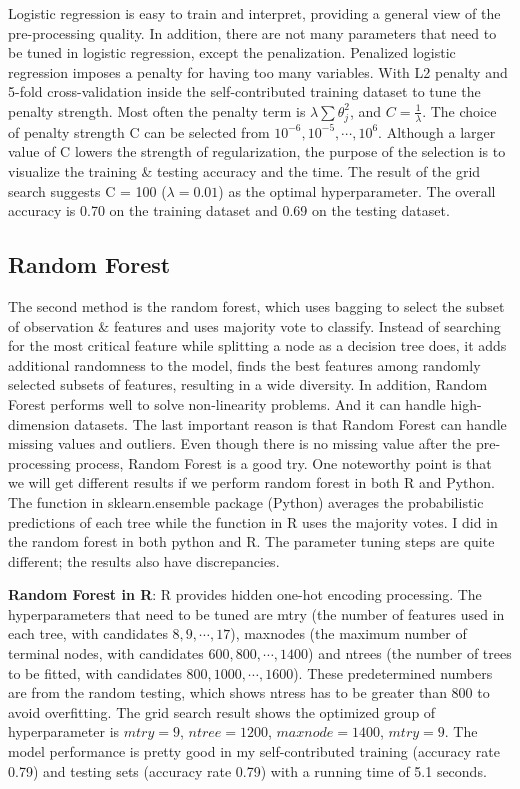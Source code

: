 \documentclass[11pt,]{article}
\begin{document}
Logistic regression is easy to train and interpret, providing a general
view of the pre-processing quality. In addition, there are not many
parameters that need to be tuned in logistic regression, except the
penalization. Penalized logistic regression imposes a penalty for having
too many variables. With L2 penalty and 5-fold cross-validation inside
the self-contributed training dataset to tune the penalty strength. Most
often the penalty term is \(\lambda \sum \theta_j ^2\), and
\(C = \frac{1}{\lambda}\). The choice of penalty strength C can be
selected from \(10^{-6}, 10^{-5},\cdots, 10^6\). Although a larger value
of C lowers the strength of regularization, the purpose of the selection
is to visualize the training \& testing accuracy and the time. The
result of the grid search suggests C = 100 (\(\lambda = 0.01\)) as the
optimal hyperparameter. The overall accuracy is 0.70 on the training
dataset and 0.69 on the testing dataset.

\hypertarget{random-forest}{%
\subsection{Random Forest}\label{random-forest}}

The second method is the random forest, which uses bagging to select the
subset of observation \& features and uses majority vote to classify.
Instead of searching for the most critical feature while splitting a
node as a decision tree does, it adds additional randomness to the
model, finds the best features among randomly selected subsets of
features, resulting in a wide diversity. In addition, Random Forest
performs well to solve non-linearity problems. And it can handle
high-dimension datasets. The last important reason is that Random Forest
can handle missing values and outliers. Even though there is no missing
value after the pre-processing process, Random Forest is a good try. One
noteworthy point is that we will get different results if we perform
random forest in both R and Python. The function in sklearn.ensemble
package (Python) averages the probabilistic predictions of each tree
while the function in R uses the majority votes. I did in the random
forest in both python and R. The parameter tuning steps are quite
different; the results also have discrepancies.

\textbf{Random Forest in R}: R provides hidden one-hot encoding
processing. The hyperparameters that need to be tuned are mtry (the
number of features used in each tree, with candidates
\(8,9,\cdots, 17\)), maxnodes (the maximum number of terminal nodes,
with candidates \(600,800,\cdots, 1400\)) and ntrees (the number of
trees to be fitted, with candidates \(800,1000,\cdots, 1600\)). These
predetermined numbers are from the random testing, which shows ntress
has to be greater than 800 to avoid overfitting. The grid search result
shows the optimized group of hyperparameter is \(mtry = 9\),
\(ntree = 1200\), \(maxnode = 1400\), \(mtry = 9\). The model
performance is pretty good in my self-contributed training (accuracy
rate 0.79) and testing sets (accuracy rate 0.79) with a running time of
5.1 seconds.
\end{document}
